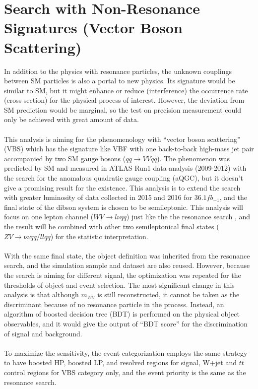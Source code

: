 \chapter{Search with Non-Resonance Signatures (Vector Boson Scattering)}
In addition to the physics with resonance particles, the unknown couplings between SM particles is also a portal to new physics. Its signature would be similar to SM, but it might enhance or reduce (interference) the occurrence rate (cross section) for the physical process of interest. However, the deviation from SM prediction would be marginal, so the test on precision measurement could only be achieved with great amount of data. 
\\
\\This analysis is aiming for the phenomenology with ``vector boson scattering'' (VBS) which has the signature like VBF with one back-to-back high-mass jet pair accompanied by two SM gauge bosons ($qq \to VVqq$). The phenomenon was predicted by SM and measured in ATLAS Run1 data analysis (2009-2012) with the search for the anomalous quadratic gauge coupling (aQGC), but it doesn't give a promising result\cite{STDM-2014-05} for the existence. This analysis is to extend the search with greater luminosity of data collected in 2015 and 2016 for $36.1fb_{-1}$, and the final state of the dibson system is chosen to be semileptonic. This analysis will focus on one lepton channel ($WV \to l\nu qq$) just like the the resonance search , and the result will be combined with other two semileptonical final states ($ZV \to \nu\nu qq/llqq$) for the statistic interpretation.
\\
\\With the same final state, the object definition was inherited from the resonance search, and the simulation sample and dataset are also reused. However, because the search is aiming for different signal, the optimization was repeated for the thresholds of object and event selection.  The most significant change in this analysis is that although $m_{WV}$ is still reconstructed, it cannot be taken as the discriminant because of no resonance particle in the process. Instead, an algorithm of boosted decision tree (BDT) is performed on the physical object observables, and it would give the output of ``BDT score'' for the discrimination of signal and background.
\\ 
\\To maximize the sensitivity, the event categorization employs the same strategy to have boosted HP, boosted LP, and resolved regions for signal, W+jet and $t\bar{t}$ control regions for VBS category only, and the event priority is the same as the resonance search.
